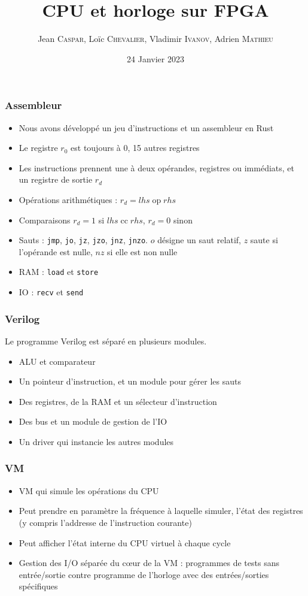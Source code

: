 \documentclass{beamer}
\title{CPU et horloge sur FPGA}
\author{
  Jean \textsc{Caspar},
  Loïc \textsc{Chevalier},
  Vladimir \textsc{Ivanov},
  Adrien \textsc{Mathieu}
}
\date{24 Janvier 2023}
\begin{document}
\begin{frame}
    \titlepage
\end{frame}

\begin{frame}[fragile]
    \frametitle{Assembleur}
    \begin{itemize}
        \item Nous avons développé un jeu d'instructions et un assembleur en Rust
        \item Le registre $r_0$ est toujours à $0$, 15 autres registres
        \item Les instructions prennent une à deux opérandes, registres ou immédiats, et un
              registre de sortie $r_d$
        \item Opérations arithmétiques : $r_d = lhs \operatorname{op} rhs$
        \item Comparaisons $r_d = 1$ si $lhs \operatorname{cc} rhs$, $r_d = 0$ sinon
        \item Sauts : \verb|jmp|, \verb|jo|, \verb|jz|, \verb|jzo|, \verb|jnz|, \verb|jnzo|.
              $o$ désigne un saut relatif, $z$ saute si l'opérande est nulle, $nz$ si elle est non nulle
        \item RAM : \verb|load| et \verb|store|
        \item IO : \verb|recv| et \verb|send|
    \end{itemize}
\end{frame}

\begin{frame}
    \frametitle{Verilog}
    Le programme Verilog est séparé en plusieurs modules.
    \begin{itemize}
        \item ALU et comparateur
        \item Un pointeur d'instruction, et un module pour gérer les sauts
        \item Des registres, de la RAM et un sélecteur d'instruction
        \item Des bus et un module de gestion de l'IO
        \item Un driver qui instancie les autres modules
    \end{itemize}
\end{frame}

\begin{frame}
    \frametitle{VM}
    \begin{itemize}
        \item VM qui simule les opérations du CPU
        \item Peut prendre en paramètre la fréquence à laquelle simuler, l'état des registres (y compris l'addresse de l'instruction courante)
        \item Peut afficher l'état interne du CPU virtuel à chaque cycle
        \item Gestion des I/O séparée du c\oe{}ur de la VM : programmes de tests sans entrée/sortie contre programme de l'horloge avec des entrées/sorties spécifiques
    \end{itemize}
\end{frame}
\end{document}
